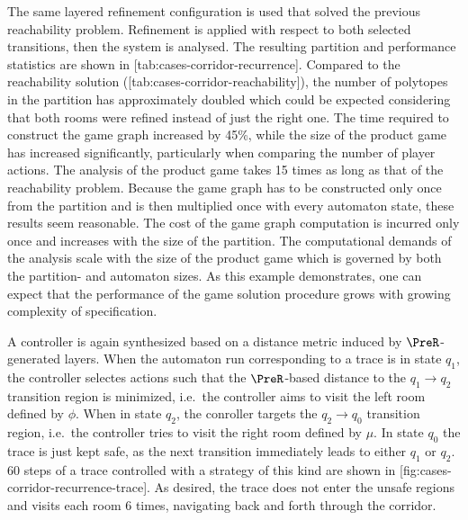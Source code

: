     The same layered refinement configuration is used that solved the previous reachability problem.
    Refinement is applied with respect to both selected transitions, then the system is analysed.
    The resulting partition and performance statistics are shown in [tab:cases-corridor-recurrence].
    Compared to the reachability solution ([tab:cases-corridor-reachability]), the number of polytopes in the partition has approximately doubled which could be expected considering that both rooms were refined instead of just the right one.
    The time required to construct the game graph increased by 45\%, while the size of the product game has increased significantly, particularly when comparing the number of player actions.
    The analysis of the product game takes 15 times as long as that of the reachability problem.
    Because the game graph has to be constructed only once from the partition and is then multiplied once with every automaton state, these results seem reasonable.
    The cost of the game graph computation is incurred only once and increases with the size of the partition.
    The computational demands of the analysis scale with the size of the product game which is governed by both the partition- and automaton sizes.
    As this example demonstrates, one can expect that the performance of the game solution procedure grows with growing complexity of specification.
    
    A controller is again synthesized based on a distance metric induced by $\PreR$-generated layers.
    When the automaton run corresponding to a trace is in state $q_1$, the controller selectes actions such that the $\PreR$-based distance to the $q_1 \rightarrow q_2$ transition region is minimized, i.e.\ the controller aims to visit the left room defined by $\phi$.
    When in state $q_2$, the conroller targets the $q_2 \rightarrow q_0$ transition region, i.e.\ the controller tries to visit the right room defined by $\mu$.
    In state $q_0$ the trace is just kept safe, as the next transition immediately leads to either $q_1$ or $q_2$.
    60 steps of a trace controlled with a strategy of this kind are shown in [fig:cases-corridor-recurrence-trace].
    As desired, the trace does not enter the unsafe regions and visits each room 6 times, navigating back and forth through the corridor.


\stopsubsection

